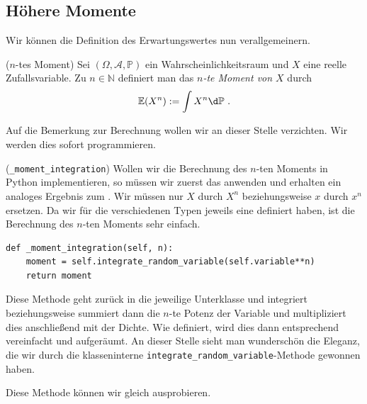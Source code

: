 \subsection{Höhere Momente}
\hypertarget{Sec:MomGenFun}{}

Wir können die Definition des Erwartungswertes nun verallgemeinern.

\begin{Definition}{($n$-tes Moment)}
Sei $(\Omega, \mathscr{A}, \mathbb{P})$ ein Wahrscheinlichkeitsraum und $X$ eine reelle Zufallsvariable. Zu $n \in \mathbb{N}$ definiert man das \textit{$n$-te Moment von $X$}  durch
\[\mathbb{E}(X^n) := \int X^n \d \mathbb{P}~.\]
\end{Definition}

Auf die Bemerkung zur Berechnung wollen wir an dieser Stelle verzichten. Wir werden dies sofort programmieren.

\begin{Code}{(\lstinline|_moment_integration|)}
\hypertarget{Code:n_Moment_Integration}{}Wollen wir die Berechnung des $n$-ten Moments in Python implementieren, so müssen wir zuerst das \hyperlink{Dichtekorollar}{} anwenden und erhalten ein analoges Ergebnis zum \hyperlink{Bem:Berechnung_Erwartung}{}. Wir müssen nur $X$ durch $X^n$ beziehungsweise $x$ durch $x^n$ ersetzen. Da wir für die verschiedenen Typen jeweils eine \hyperlink{Code:Integrate}{} definiert haben, ist die Berechnung des $n$-ten Moments sehr einfach.
\begin{lstlisting}
def _moment_integration(self, n):
    moment = self.integrate_random_variable(self.variable**n)
    return moment
\end{lstlisting}
Diese Methode geht zurück in die jeweilige Unterklasse und integriert beziehungsweise summiert dann die $n$-te Potenz der Variable und multipliziert dies anschließend mit der Dichte. Wie definiert, wird dies dann entsprechend vereinfacht und aufgeräumt. An dieser Stelle sieht man wunderschön die Eleganz, die wir durch die klasseninterne \lstinline|integrate_random_variable|-Methode gewonnen haben.
\end{Code}

Diese Methode können wir gleich ausprobieren.

